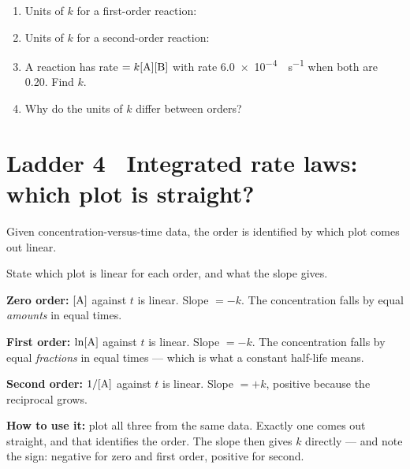 \documentclass{apchem-worksheet}
\begin{document}
\begin{yourturn}
\begin{enumerate}[leftmargin=*,itemsep=0.5em]
  \item Units of $k$ for a first-order reaction: \workspace[1.4cm]
  \item Units of $k$ for a second-order reaction: \workspace[1.4cm]
  \item A reaction has rate $= k[\ce{A}][\ce{B}]$ with rate
        \SI{6.0e-4}{\Molar\per\second} when both are
        \SI{0.20}{\Molar}. Find $k$. \workspace[1.8cm]
  \item Why do the units of $k$ differ between orders?
        \workspace[1.6cm]
\end{enumerate}
\end{yourturn}

\section*{\sffamily Ladder 4 \textbullet\ Integrated rate laws: which plot is straight?}

Given concentration-versus-time data, the order is identified by which
plot comes out linear.

\begin{workedexample}
State which plot is linear for each order, and what the slope gives.

\textbf{Zero order:} $[\ce{A}]$ against $t$ is linear. Slope $= -k$.
The concentration falls by equal \emph{amounts} in equal times.

\textbf{First order:} $\ln[\ce{A}]$ against $t$ is linear. Slope
$= -k$. The concentration falls by equal \emph{fractions} in equal times
--- which is what a constant half-life means.

\textbf{Second order:} $1/[\ce{A}]$ against $t$ is linear. Slope
$= +k$, positive because the reciprocal grows.

\textbf{How to use it:} plot all three from the same data. Exactly one
comes out straight, and that identifies the order. The slope then gives
$k$ directly --- and note the sign: negative for zero and first order,
positive for second.
\end{workedexample}
\end{document}
